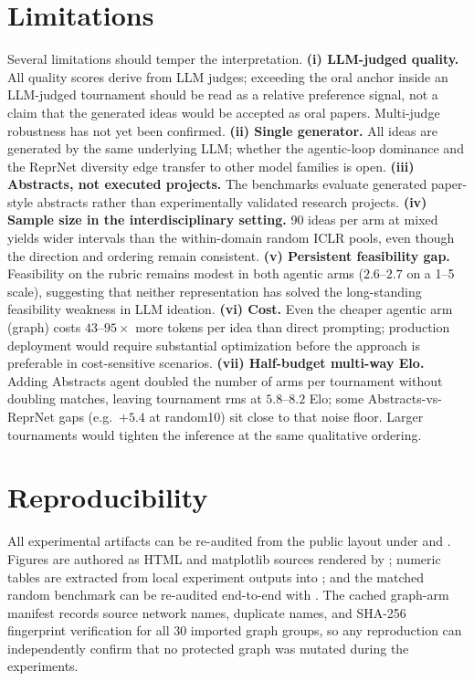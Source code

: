 \documentclass[10pt,twocolumn]{article}
\begin{document}
\section{Limitations}

Several limitations should temper the interpretation.
\textbf{(i) LLM-judged quality.}  All quality scores derive from LLM
judges; exceeding the oral anchor inside an LLM-judged tournament
should be read as a relative preference signal, not a claim that the
generated ideas would be accepted as oral papers.  Multi-judge
robustness has not yet been confirmed.
\textbf{(ii) Single generator.}  All ideas are generated by the same
underlying LLM; whether the agentic-loop dominance and the ReprNet
diversity edge transfer to other model families is open.
\textbf{(iii) Abstracts, not executed projects.}  The benchmarks
evaluate generated paper-style abstracts rather than experimentally
validated research projects.
\textbf{(iv) Sample size in the interdisciplinary setting.}  90 ideas
per arm at mixed yields wider intervals than the within-domain
random ICLR pools, even though the direction and ordering remain
consistent.
\textbf{(v) Persistent feasibility gap.}  Feasibility on the rubric
remains modest in both agentic arms ($2.6$--$2.7$ on a 1--5 scale),
suggesting that neither representation has solved the long-standing
feasibility weakness in LLM ideation.
\textbf{(vi) Cost.}  Even the cheaper agentic arm (graph) costs
$43$--$95\times$ more tokens per idea than direct prompting; production
deployment would require substantial optimization before the approach
is preferable in cost-sensitive scenarios.
\textbf{(vii) Half-budget multi-way Elo.}  Adding Abstracts agent doubled
the number of arms per tournament without doubling matches, leaving
tournament rms at $5.8$--$8.2$ Elo; some Abstracts-vs-ReprNet gaps
(e.g.\ $+5.4$ at random10) sit close to that noise floor.  Larger
tournaments would tighten the inference at the same qualitative
ordering.

\section{Reproducibility}

All experimental artifacts can be re-audited from the public layout under
 and .  Figures are authored as HTML and
matplotlib sources rendered by ;
numeric tables are extracted from local experiment outputs into
; and the matched random benchmark can be
re-audited end-to-end with
.  The cached graph-arm manifest records source network names,
duplicate names, and SHA-256 fingerprint verification for all 30 imported
graph groups, so any reproduction can independently confirm that no
protected graph was mutated during the experiments.
\end{document}
